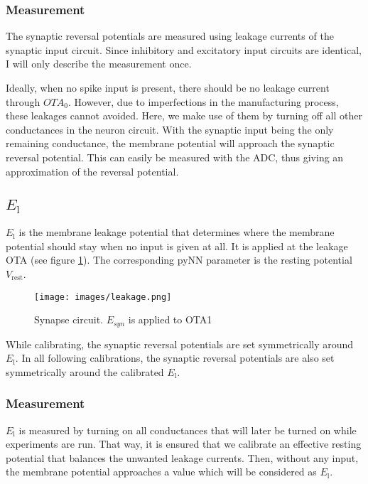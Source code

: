 \documentclass[12pt,a4paper,bibliography=totocnumbered,listof=totocnumbered]{scrartcl}
\begin{document}
\subsubsection*{Measurement}
The synaptic reversal potentials are measured using leakage currents of the synaptic input circuit.
Since inhibitory and excitatory input circuits are identical, I will only describe the measurement once.

Ideally, when no spike input is present, there should be no leakage current through $OTA_0$.
However, due to imperfections in the manufacturing process, these leakages cannot avoided.
Here, we make use of them by turning off all other conductances in the neuron circuit.
With the synaptic input being the only remaining conductance, the membrane potential will approach the synaptic reversal potential.
This can easily be measured with the ADC, thus giving an approximation of the reversal potential.

\subsection{$E_\text{l}$}
$E_\text{l}$ is the membrane leakage potential that determines where the membrane potential should stay when no input is given at all.
It is applied at the leakage OTA (see figure \ref{figure:leakage}).
The corresponding pyNN parameter is the resting potential $V_\text{rest}$.

\begin{figure}[h]
\begin{center}
\texttt{[image: images/leakage.png]}
\caption{Synapse circuit. $E_{syn}$ is applied to OTA1}
\label{figure:leakage}
\end{center}
\end{figure}

While calibrating, the synaptic reversal potentials are set symmetrically around $E_\text{l}$.
In all following calibrations, the synaptic reversal potentials are also set symmetrically around the calibrated $E_\text{l}$.

\subsubsection*{Measurement}
$E_\text{l}$ is measured by turning on all conductances that will later be turned on while experiments are run.
That way, it is ensured that we calibrate an effective resting potential that balances the unwanted leakage currents.
Then, without any input, the membrane potential approaches a value which will be considered as $E_\text{l}$.
\end{document}
